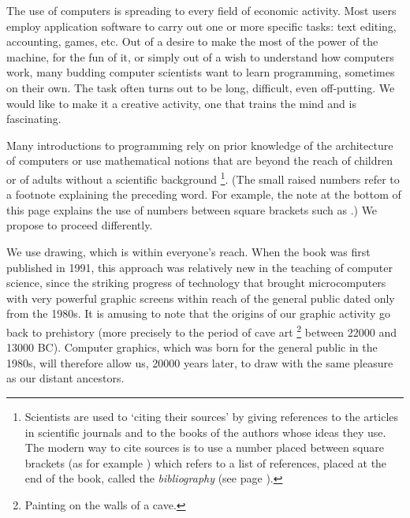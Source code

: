 The use of computers is spreading to every field of economic
activity. Most users employ application
soft\-ware
to carry out one or more specific tasks: text
editing, ac\-count\-ing, games, etc. Out of a desire to make the most of the
power of the machine, for the fun of it, or simply out of a
wish to understand how computers work,
many budding computer scientists want to learn
programming, sometimes on their own. The task often turns out to be long, difficult,
even off-putting. We would like to make it a creative activity,
one that trains the mind and is fascinating.

\medskip

Many introductions to programming rely on prior knowledge
of the architecture of computers or use mathematical
notions that are beyond the reach of children or of adults
without a scientific background \cite{LT}\@%
\footnote{
Scientists are used to `citing their sources' by
giving references to the articles in scientific journals and to the
books of the authors whose ideas they use. The modern way to
cite sources is to use a number placed between square brackets
(as for example \cite{LT}) which refers to a list of
references, placed at the end of the book, called the
{\em bibliography} (see page
\pageref{ch:biblio}).}. {\footnotesize (The small
raised numbers refer to a
 footnote explaining the preceding word. For example, the note at
 the bottom of this page explains the use of numbers between square brackets
 such as \cite{LT}.)} We propose to proceed differently.

\medskip

We use drawing, which is within everyone's reach. When the book was first published
in 1991, this approach was
relatively new in the teaching of computer science, since the
strik\-ing progress of technology that brought microcomputers with very
powerful graphic screens within reach of the
general public dated only from the 1980s. It is amusing to note that
the origins of our graphic activity go back to prehistory (more precisely to
the period of cave art%
%
\footnote{Painting on the walls of a cave.
} between 22000 and 13000 BC). Computer graphics, which was born for the general public
in the 1980s, will therefore allow us, 20000 years later, to draw with
the same pleasure as our distant ancestors.

\medskip

